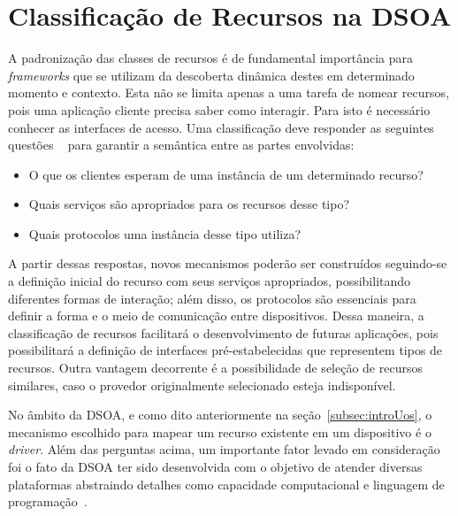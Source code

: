 \chapter{Classificação de Recursos na DSOA}
\label{cap:proposta}

A padronização das classes de recursos é de fundamental importância para \emph{frameworks} que se utilizam da descoberta dinâmica destes em determinado momento e contexto. Esta não se limita apenas a uma tarefa de nomear recursos, pois uma aplicação cliente precisa saber como interagir. Para isto é necessário conhecer as interfaces de acesso. Uma classificação deve responder as seguintes questões ~\cite{pervasiveComputing} para garantir a semântica entre as partes envolvidas:

\begin{itemize}
	\item O que os clientes esperam de uma instância de um determinado recurso?

	\item Quais serviços são apropriados para os recursos desse tipo?

	\item Quais protocolos uma instância desse tipo utiliza?
\end{itemize}

A partir dessas respostas, novos mecanismos poderão ser construídos seguindo-se a definição inicial do recurso com seus serviços apropriados, possibilitando diferentes formas de interação; além disso, os protocolos são essenciais para definir a forma e o meio de comunicação entre dispositivos. Dessa maneira, a classificação de recursos facilitará o desenvolvimento de futuras aplicações, pois possibilitará a definição de interfaces pré-estabelecidas que representem tipos de recursos. Outra vantagem decorrente é a possibilidade de seleção de recursos similares, caso o provedor originalmente selecionado esteja indisponível.

No âmbito da DSOA, e como dito anteriormente na seção~\ref{subsec:introUos}, o mecanismo escolhido para mapear um recurso existente em um dispositivo é o \emph{driver}. Além das perguntas acima, um importante fator levado em consideração foi o fato da DSOA ter sido desenvolvida com o objetivo de atender diversas plataformas abstraindo detalhes como capacidade computacional e linguagem de programação~\cite{buzetoDSOA2010}.

